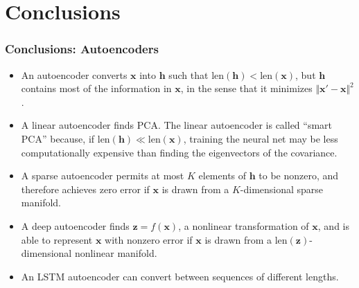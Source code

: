 \documentclass{beamer}
\begin{document}
\section{Conclusions}
\setcounter{subsection}{1}

\begin{frame}
  \frametitle{Conclusions: Autoencoders}

  \begin{itemize}
  \item An autoencoder converts $\bm{x}$ into $\bm{h}$ such that
    $\text{len}(\bm{h})<\text{len}(\bm{x})$, but $\bm{h}$ contains
    most of the information in $\bm{x}$, in the sense that it
    minimizes $\Vert\bm{x'}-\bm{x}\Vert^2$.
  \item A linear autoencoder finds PCA.  The linear autoencoder is
    called ``smart PCA'' because, if
    $\text{len}(\bm{h})\ll\text{len}(\bm{x})$, training the neural net
    may be less computationally expensive than finding the
    eigenvectors of the covariance.
  \item A sparse autoencoder permits at most $K$ elements of $\bm{h}$
    to be nonzero, and therefore achieves zero error if $\bm{x}$ is
    drawn from a $K$-dimensional sparse manifold.
  \item A deep autoencoder finds $\bm{z}=f(\bm{x})$, a nonlinear
    transformation of $\bm{x}$, and is able to represent $\bm{x}$ with
    nonzero error if $\bm{x}$ is drawn from a
    $\text{len}(\bm{z})$-dimensional nonlinear manifold.
  \item An LSTM autoencoder can convert between sequences of different lengths.
  \end{itemize}
\end{frame}
\end{document}
